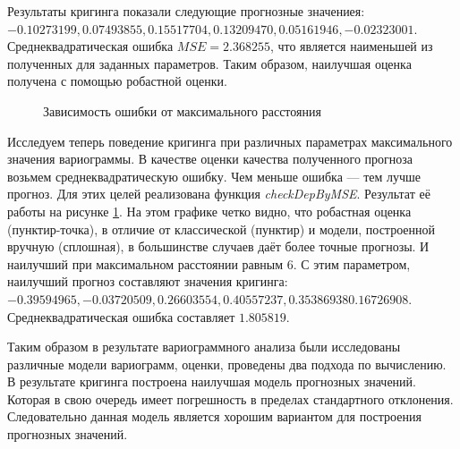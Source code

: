 Результаты кригинга показали следующие прогнозные значениея: $-0.10273199, 0.07493855, 0.15517704, 0.13209470, 0.05161946, -0.02323001$. Среднеквадратическая ошибка $MSE=2.368255$, что является наименьшей из полученных для заданных параметров. Таким образом, наилучшая оценка получена с помощью робастной оценки.

\begin{figure}[H]
\caption{Зависимость ошибки от максимального расстояния}
\label{img:check-dep}
\end{figure}

Исследуем теперь поведение кригинга при различных параметрах максимального значения вариограммы. В качестве оценки качества полученного прогноза возьмем среднеквадратическую ошибку. Чем меньше ошибка --- тем лучше прогноз. Для этих целей реализована функция \textit{checkDepByMSE}. Результат её работы на рисунке \ref{img:check-dep}. На этом графике четко видно, что робастная оценка (пунктир-точка), в отличие от классической (пунктир) и модели, построенной вручную (сплошная), в большинстве случаев даёт более точные прогнозы. И наилучший при максимальном расстоянии равным $6$. С этим параметром, наилучший прогноз составляют значения кригинга: $-0.39594965, -0.03720509,  0.26603554,  0.40557237,  0.35386938  0.16726908$. Среднеквадратическая ошибка составляет $1.805819$.



Таким образом в результате вариограммного анализа были исследованы различные модели вариограмм, оценки, проведены два подхода по вычислению. В результате кригинга построена наилучшая модель прогнозных значений. Которая в свою очередь имеет погрешность в пределах стандартного отклонения. Следовательно данная модель является хорошим вариантом для построения прогнозных значений.

